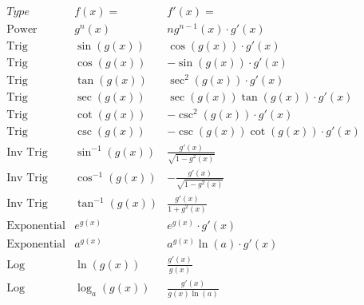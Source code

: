 \documentclass{ximera}
\begin{document}
\begin{center}
\[
\begin{array}{c|c|c}
		Type & f(x)= & f'(x)=  \\
		\hline
		\text{Power} & g^n(x) & ng^{n-1}(x)\cdot g'(x)  \\
		\hline
		\text{Trig} & \sin(g(x)) & \cos(g(x)) \cdot g'(x) \\
		\text{Trig} & \cos(g(x)) & -\sin(g(x))\cdot g'(x)  \\
		\hline
		\text{Trig} & \tan(g(x)) & \sec^2(g(x)) \cdot g'(x) \\
		\text{Trig} & \sec(g(x)) & \sec(g(x))\tan(g(x)) \cdot g'(x) \\
		\hline
		\text{Trig} & \cot(g(x)) & -\csc^2(g(x)) \cdot g'(x)  \\
		\text{Trig} & \csc(g(x)) & -\csc(g(x))\cot(g(x)) \cdot g'(x)  \\
		\hline
		\text{Inv Trig} & \sin^{-1}(g(x)) & \frac{g'(x)}{\sqrt{1-g^2(x)}}  \\
		\text{Inv Trig} & \cos^{-1}(g(x)) & -\frac{g'(x)}{\sqrt{1-g^2(x)}} \\
		\text{Inv Trig} & \tan^{-1}(g(x)) & \frac{g'(x)}{1+g^2(x)} \\
		\hline
		\text{Exponential} & e^{g(x)} & e^{g(x)} \cdot g'(x) \\
		\text{Exponential} & a^{g(x)} & a^{g(x)}\ln(a) \cdot g'(x) \\
		\hline
		\text{Log} & \ln(g(x)) & \frac{g'(x)}{g(x)} \\
		\text{Log} & \log_a(g(x)) & \frac{g'(x)}{g(x)\ln(a)}
	\end{array}
    \]
\end{center}




\begin{onlineOnly}
  \begin{center}
  \end{center}
\end{onlineOnly}
\end{document}
